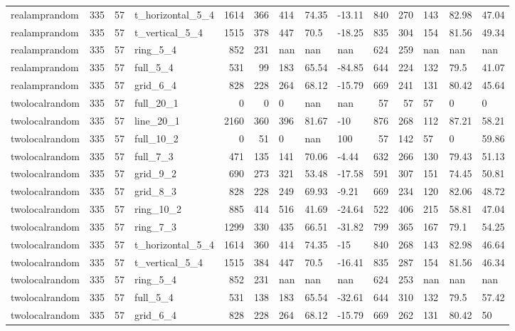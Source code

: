 \begin{longtable}{lrrlrrlllrrlll}
realamprandom & 335 & 57 & t\_horizontal\_5\_4 & 1614 & 366 & 414 & 74.35 & -13.11 & 840 & 270 & 143 & 82.98 & 47.04 \\
realamprandom & 335 & 57 & t\_vertical\_5\_4 & 1515 & 378 & 447 & 70.5 & -18.25 & 835 & 304 & 154 & 81.56 & 49.34 \\
realamprandom & 335 & 57 & ring\_5\_4 & 852 & 231 & nan & nan & nan & 624 & 259 & nan & nan & nan \\
realamprandom & 335 & 57 & full\_5\_4 & 531 & 99 & 183 & 65.54 & -84.85 & 644 & 224 & 132 & 79.5 & 41.07 \\
realamprandom & 335 & 57 & grid\_6\_4 & 828 & 228 & 264 & 68.12 & -15.79 & 669 & 241 & 131 & 80.42 & 45.64 \\
twolocalrandom & 335 & 57 & full\_20\_1 & 0 & 0 & 0 & nan & nan & 57 & 57 & 57 & 0 & 0 \\
twolocalrandom & 335 & 57 & line\_20\_1 & 2160 & 360 & 396 & 81.67 & -10 & 876 & 268 & 112 & 87.21 & 58.21 \\
twolocalrandom & 335 & 57 & full\_10\_2 & 0 & 51 & 0 & nan & 100 & 57 & 142 & 57 & 0 & 59.86 \\
twolocalrandom & 335 & 57 & full\_7\_3 & 471 & 135 & 141 & 70.06 & -4.44 & 632 & 266 & 130 & 79.43 & 51.13 \\
twolocalrandom & 335 & 57 & grid\_9\_2 & 690 & 273 & 321 & 53.48 & -17.58 & 591 & 307 & 151 & 74.45 & 50.81 \\
twolocalrandom & 335 & 57 & grid\_8\_3 & 828 & 228 & 249 & 69.93 & -9.21 & 669 & 234 & 120 & 82.06 & 48.72 \\
twolocalrandom & 335 & 57 & ring\_10\_2 & 885 & 414 & 516 & 41.69 & -24.64 & 522 & 406 & 215 & 58.81 & 47.04 \\
twolocalrandom & 335 & 57 & ring\_7\_3 & 1299 & 330 & 435 & 66.51 & -31.82 & 799 & 365 & 167 & 79.1 & 54.25 \\
twolocalrandom & 335 & 57 & t\_horizontal\_5\_4 & 1614 & 360 & 414 & 74.35 & -15 & 840 & 268 & 143 & 82.98 & 46.64 \\
twolocalrandom & 335 & 57 & t\_vertical\_5\_4 & 1515 & 384 & 447 & 70.5 & -16.41 & 835 & 287 & 154 & 81.56 & 46.34 \\
twolocalrandom & 335 & 57 & ring\_5\_4 & 852 & 231 & nan & nan & nan & 624 & 253 & nan & nan & nan \\
twolocalrandom & 335 & 57 & full\_5\_4 & 531 & 138 & 183 & 65.54 & -32.61 & 644 & 310 & 132 & 79.5 & 57.42 \\
twolocalrandom & 335 & 57 & grid\_6\_4 & 828 & 228 & 264 & 68.12 & -15.79 & 669 & 262 & 131 & 80.42 & 50 \\

\end{longtable}
